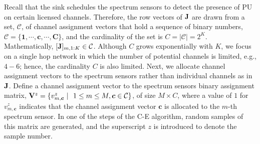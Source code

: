 \documentclass[journal]{IEEEtran} \ifCLASSINFOpdf
\begin{document}
Recall that the sink schedules the spectrum sensors to detect the presence of PU on certain licensed channels. Therefore, the row vectors of ${\bf J}$ are drawn from a set, $\mathcal{C}$, of channel assignment vectors that hold a sequence of binary numbers, $\mathcal{C}=\{\bm{1}, \cdots, \bm{c}, \cdots, \bm{C}\}$, and the cardinality of the set is $C= |\mathcal{C}| = 2^K$. Mathematically, $[{\bf J}]_{m,1:K} \in \mathcal{C}$. Although $C$ grows exponentially with $K$, we focus on a single hop network in which the number of potential channels is limited, e.g., $4 - 6$; hence, the cardinality $C$ is also limited. Next, we allocate channel assignment vectors to the spectrum sensors rather than individual channels as in ${\bf J}$. Define a channel assignment vector to the spectrum sensors binary assignment matrix, ${\bf V}^z=\{v^z_{m,\bm{c}}~|~\ 1 \leq m \leq M, \bm{c} \in \mathcal{C}\}$, of size $M \times C$, where a value of $1$ for $v^z_{m,\bm{c}}$ indicates that the  channel assignment vector $\bm{c}$ is allocated to the $m$-th spectrum sensor. In one of the steps of the C-E algorithm, random samples of this matrix are generated, and the superscript $z$ is introduced to denote the sample number.
\end{document}
